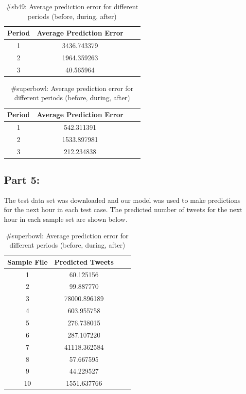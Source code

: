 \documentclass[12pt]{article}
\begin{document}
\begin{table}[H]
	\centering
	\begin{tabular}{| c | c | c | c |}
		\hline 
		Period & Average Prediction Error \\\hline
		1 & 3436.743379 \\\hline
		2 & 1964.359263 \\\hline 
		3 & 40.565964 \\\hline
	\end{tabular} 
	\caption{\#sb49: Average prediction error for different periods (before, during, after)}
	\label{part1:tab1}
\end{table} 


\begin{table}[H]
	\centering
	\begin{tabular}{| c | c | c | c |}
		\hline 
		Period & Average Prediction Error \\\hline
		1 & 542.311391 \\\hline
		2 & 1533.897981 \\\hline 
		3 & 212.234838 \\\hline
	\end{tabular} 
	\caption{\#superbowl: Average prediction error for different periods (before, during, after)}
	\label{part1:tab1}
\end{table} 

\subsection{Part 5:}

The test data set was downloaded and our model was used to make predictions for the next hour in each test case. The predicted number of tweets for the next hour in each sample set are shown below.

\begin{table}[H]
	\centering
	\begin{tabular}{| c | c | c | c |}
		\hline 
		Sample File & Predicted Tweets \\\hline
		1 & 60.125156 \\\hline
		2 & 99.887770 \\\hline 
		3 & 78000.896189 \\\hline
		4 & 603.955758 \\\hline
		5 & 276.738015 \\\hline
		6 & 287.107220 \\\hline
		7 & 41118.362584 \\\hline
		8 & 57.667595 \\\hline
		9 & 44.229527 \\\hline
		10 & 1551.637766 \\\hline
	\end{tabular} 
	\caption{\#superbowl: Average prediction error for different periods (before, during, after)}
	\label{part1:tab1}
\end{table} 
\end{document}
